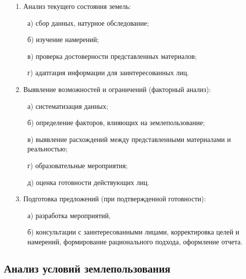 \begin{enumerate}
    \item[1.] Анализ текущего состояния земель: 
    \begin{enumerate}
        \item[а)] сбор данных, натурное обследование; 
        \item[б)] изучение намерений;
        \item[в)] проверка достоверности представленных материалов;
        \item[г)] адаптация информации для заинтересованных лиц.
    \end{enumerate}
    \item[2.] Выявление возможностей и ограничений (факторный анализ):
    \begin{enumerate}
        \item[а)] систематизация данных;
        \item[б)] определение факторов, влияющих на землепользование; 
        \item[в)] выявление расхождений между представленными материалами и реальностью;
        \item[г)] образовательные мероприятия; 
        \item[д)] оценка готовности действующих лиц.
    \end{enumerate}
    \item[3.] Подготовка предложений (при подтвержденной готовности): 
    \begin{enumerate}
        \item[а)] разработка мероприятий, 
        \item[б)] консультации с заинтересованными лицами, корректировка целей и намерений, формирование рационального подхода, оформление отчета.
    \end{enumerate}
\end{enumerate}

\subsection{Анализ условий землепользования}
\label{subsec:zem}

